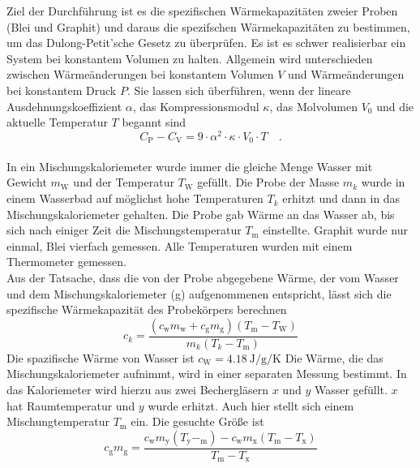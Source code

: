 Ziel der Durchführung ist es die spezifischen Wärmekapazitäten zweier Proben (Blei und Graphit) und daraus  die spezifschen Wärmekapazitäten zu bestimmen, um das Dulong-Petit'sche Gesetz zu überprüfen.
Es ist es schwer realisierbar ein System bei konstantem Volumen zu halten. Allgemein wird unterschieden zwischen Wärmeänderungen bei konstantem Volumen $V$ und Wärmeänderungen bei konstantem Druck $P$. Sie lassen sich überführen, wenn der lineare Ausdehnungskoeffizient $\alpha$, das Kompressionsmodul $\kappa$, das Molvolumen $V_0$ und die aktuelle Temperatur $T$ begannt sind
\begin{equation}\label{konstanter Druck -> konstantem Volumen}
  C_\text{P} - C_\text{V} = 9 \cdot \alpha^2 \cdot \kappa \cdot V_0 \cdot T \quad.
\end{equation}  \\
In ein Mischungskaloriemeter wurde immer die gleiche Menge Wasser mit Gewicht $m_\text{W}$ und der Temperatur $T_\text{W}$ gefüllt.
Die Probe der Masse $m_k$ wurde in einem Wasserbad auf möglichst hohe Temperaturen $T_k$ erhitzt und dann in das Mischungskaloriemeter gehalten. Die Probe gab Wärme an das Wasser ab, bis sich nach einiger Zeit die Mischungstemperatur $T_\text{m}$ einstellte. Graphit wurde nur einmal, Blei vierfach gemessen. Alle Temperaturen wurden mit einem Thermometer gemessen.
\\
Aus der Tatsache, dass die von der Probe abgegebene Wärme, der vom Wasser und dem Mischungskaloriemeter (g) aufgenommenen entspricht, lässt sich die spezifische Wärmekapazität des Probekörpers berechnen
\begin{equation}\label{Warmekapazitat Stoff}
  c_k = \frac{(c_\text{w} m_\text{w} + c_\text{g} m_\text{g})(T_\text{m} - T_\text{W})}{m_k (T_k - T_\text{m})}
\end{equation}
Die spazifische Wärme von Wasser ist $c_\text{W} = \SI{4.18}{\joule\per\gram\per\kelvin}$ Die Wärme, die das Mischungskaloriemeter aufnimmt, wird in einer separaten Messung bestimmt. In das Kaloriemeter wird hierzu aus zwei Bechergläsern $x$ und $y$ Wasser gefüllt. $x$ hat Raumtemperatur und $y$ wurde erhitzt. Auch hier stellt sich einem Mischungtemperatur $T_\text{m}$ ein. Die gesuchte Größe ist
\begin{equation}\label{Warmekapazitat Kalorimeter}
  c_\text{g} m_\text{g} = \frac{c_\text{w} m_\text{y}(T_\text{y}-_\text{m}) - c_\text{w} m_\text{x}(T_\text{m}-T_\text{x})}{T_\text{m} - T_\text{x}}
\end{equation}
